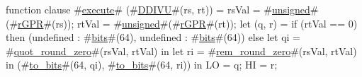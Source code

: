 function clause #\hyperref[zexecute]{execute}# (#\hyperref[zDDIVU]{DDIVU}#(rs, rt)) =
  {
    rsVal = #\hyperref[zunsigned]{unsigned}#(#\hyperref[zrGPR]{rGPR}#(rs));
    rtVal = #\hyperref[zunsigned]{unsigned}#(#\hyperref[zrGPR]{rGPR}#(rt));
    let (q, r) =
      if (rtVal == 0)
        then (undefined  : #\hyperref[zbits]{bits}#(64), undefined : #\hyperref[zbits]{bits}#(64))
      else
        let qi = #\hyperref[zquotzyroundzyzzero]{quot\_round\_zero}#(rsVal, rtVal) in
        let ri = #\hyperref[zremzyroundzyzzero]{rem\_round\_zero}#(rsVal, rtVal) in
	(#\hyperref[ztozybits]{to\_bits}#(64, qi), #\hyperref[ztozybits]{to\_bits}#(64, ri)) in
    {
      LO    = q;
      HI    = r;
    }
  }
